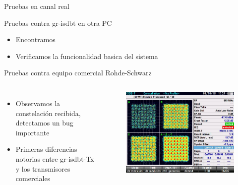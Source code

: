 
\begin{frame}{Pruebas en canal real}
\begin{block}{Pruebas contra gr-isdbt en otra PC}
	\begin{itemize}	
		\item { Encontramos  }
		\item { Verificamos la funcionalidad basica del sistema }
	\end{itemize}
\end{block}

\begin{block}{Pruebas contra equipo comercial Rohde-Schwarz}
\begin{columns}
	\begin{itemize}	
		\item {	Observamos la constelación recibida, detectamos un bug importante }
		\item { Primeras diferencias notorias entre gr-isdbt-Tx y los transmisores comerciales }
	\end{itemize}
	\begin{figure}
		\includegraphics[scale=0.25]{constelacion_eth}
	\end{figure}
\end{columns}
\end{block}
\end{frame}

